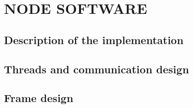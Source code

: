 \section{NODE SOFTWARE}

\subsection{Description of the implementation}
\clearpage
\subsection{Threads and communication design} %
\clearpage
\subsection{Frame design}